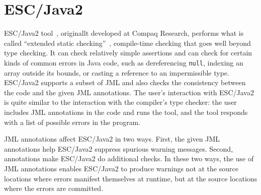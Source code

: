 \section{ESC/Java2}
\label{escjava}

ESC/Java2 tool~\cite{Flanagan-Et-Al02}, originallt developed at Compaq Research,
performs what is called ``extended static
checking''~\cite{ESC:Overview,10yearsESC},
compile-time checking that goes well beyond type checking.  It can
check relatively simple assertions and can check for certain kinds of
common errors in Java code, such as dereferencing \texttt{null},
indexing an array outside its bounds, or casting a reference to an
impermissible type.  ESC/Java2 supports a subset of JML and also checks
the consistency between the code and the given JML annotations.  The
user's interaction with ESC/Java2 is quite similar to the interaction
with the compiler's type checker: the user includes JML annotations in
the code and runs the tool, and the tool responds with a list of
possible errors in the program.

JML annotations affect ESC/Java2 in two ways.  First, the given JML
annotations help ESC/Java2 suppress spurious warning messages.   Second,
annotations make ESC/\-Java2 do additional checks.  
In these two ways, the use of JML annotations enables ESC/Java2 to
produce warnings not at the source locations where errors manifest
themselves at runtime, but at the source locations where the errors
are committed.




